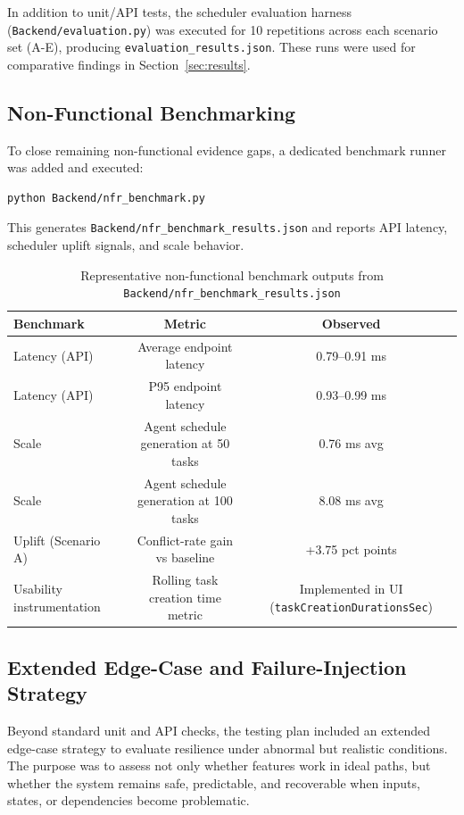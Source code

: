 \documentclass[12pt]{article}
\begin{document}
In addition to unit/API tests, the scheduler evaluation harness (\texttt{Backend/evaluation.py}) was executed for 10 repetitions across each scenario set (A-E), producing \texttt{evaluation\_results.json}. These runs were used for comparative findings in Section~\ref{sec:results}.

\subsection{Non-Functional Benchmarking}
To close remaining non-functional evidence gaps, a dedicated benchmark runner was added and executed:
\begin{verbatim}
python Backend/nfr_benchmark.py
\end{verbatim}
This generates \texttt{Backend/nfr\_benchmark\_results.json} and reports API latency, scheduler uplift signals, and scale behavior.

\begin{table}[h!]
\centering
\small
\begin{tabular}{|l|c|c|}
\hline
\textbf{Benchmark} & \textbf{Metric} & \textbf{Observed} \\
\hline
Latency (API) & Average endpoint latency & 0.79--0.91 ms \\
\hline
Latency (API) & P95 endpoint latency & 0.93--0.99 ms \\
\hline
Scale & Agent schedule generation at 50 tasks & 0.76 ms avg \\
\hline
Scale & Agent schedule generation at 100 tasks & 8.08 ms avg \\
\hline
Uplift (Scenario A) & Conflict-rate gain vs baseline & +3.75 pct points \\
\hline
Usability instrumentation & Rolling task creation time metric & Implemented in UI (\texttt{taskCreationDurationsSec}) \\
\hline
\end{tabular}
\caption{Representative non-functional benchmark outputs from \texttt{Backend/nfr\_benchmark\_results.json}}
\label{tab:nfr_benchmark}
\end{table}

\subsection{Extended Edge-Case and Failure-Injection Strategy}
Beyond standard unit and API checks, the testing plan included an extended edge-case strategy to evaluate resilience under abnormal but realistic conditions. The purpose was to assess not only whether features work in ideal paths, but whether the system remains safe, predictable, and recoverable when inputs, states, or dependencies become problematic.
\end{document}
